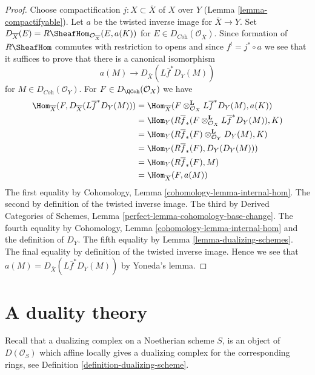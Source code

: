 \begin{proof}
Choose compactification $j : X \subset \overline{X}$ of $X$ over $Y$
(Lemma \ref{lemma-compactifyable}). Let $a$ be the twisted inverse
image for $\overline{X} \to Y$. Set
$D_{\overline{X}}(E) = R\SheafHom_{\mathcal{O}_{\overline{X}}}(E, a(K))$
for $E \in D_{\textit{Coh}}(\mathcal{O}_{\overline{X}})$.
Since formation of $R\SheafHom$ commutes with restriction to opens
and since $f^! = j^* \circ a$ we see that it suffices to prove that
there is a canonical isomorphism
$$
a(M) \longrightarrow D_{\overline{X}}(L\overline{f}^*D_Y(M))
$$
for $M \in D_{\textit{Coh}}(\mathcal{O}_Y)$. For
$F \in D_\QCoh(\mathcal{O}_X)$ we have
\begin{align*}
\Hom_{\overline{X}}(
F, D_{\overline{X}}(L\overline{f}^*D_Y(M)))
& =
\Hom_{\overline{X}}(
F \otimes_{\mathcal{O}_X}^\mathbf{L} L\overline{f}^*D_Y(M), a(K)) \\
& =
\Hom_Y(
R\overline{f}_*(F \otimes_{\mathcal{O}_X}^\mathbf{L} L\overline{f}^*D_Y(M)),
K) \\
& =
\Hom_Y(
R\overline{f}_*(F) \otimes_{\mathcal{O}_Y}^\mathbf{L} D_Y(M),
K) \\
& =
\Hom_Y(
R\overline{f}_*(F), D_Y(D_Y(M))) \\
& =
\Hom_Y(R\overline{f}_*(F), M) \\
& = \Hom_{\overline{X}}(F, a(M))
\end{align*}
The first equality by Cohomology, Lemma \ref{cohomology-lemma-internal-hom}.
The second by definition of the twisted inverse image.
The third by Derived Categories of Schemes, Lemma
\ref{perfect-lemma-cohomology-base-change}.
The fourth equality by Cohomology, Lemma \ref{cohomology-lemma-internal-hom}
and the definition of $D_Y$.
The fifth equality by Lemma \ref{lemma-dualizing-schemes}.
The final equality by definition of the twisted inverse image.
Hence we see that $a(M) = D_{\overline{X}}(L\overline{f}^*D_Y(M))$
by Yoneda's lemma.
\end{proof}








\section{A duality theory}
\label{section-duality}

\noindent
Recall that a dualizing complex on a Noetherian scheme $S$, is an
object of $D(\mathcal{O}_S)$ which affine locally gives a dualizing
complex for the corresponding rings, see
Definition \ref{definition-dualizing-scheme}.

